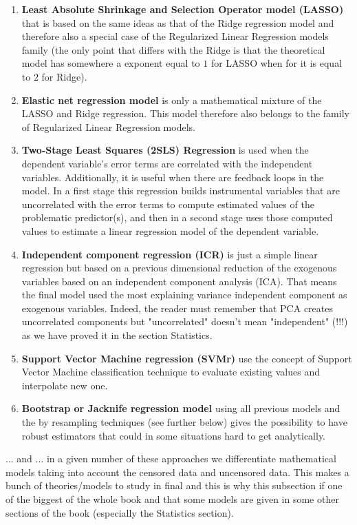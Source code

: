 \begin{enumerate}
		\item \textbf{Least Absolute Shrinkage and Selection Operator model (LASSO)} that is based on the same ideas as that of the Ridge regression model and therefore also a special case of the Regularized Linear Regression models family (the only point that differs with the Ridge is that the theoretical model has somewhere a exponent equal to $1$ for LASSO when for it is equal to $2$ for Ridge).
		
		\item \textbf{Elastic net regression model} is only a mathematical mixture of the LASSO and Ridge regression. This model therefore also belongs to the family of Regularized Linear Regression models.
		
		\item \textbf{Two-Stage Least Squares (2SLS) Regression } is used when the dependent variable’s error terms are correlated with the independent variables. Additionally, it is useful when there are feedback loops in the model. In a first stage this regression builds instrumental variables that are uncorrelated with the error terms to compute estimated values of the problematic predictor(s), and then in a second stage uses those computed values to estimate a linear regression model of the dependent variable.
		
		\item \textbf{Independent component regression (ICR)} is just a simple linear regression but based on a previous dimensional reduction of the exogenous variables based on an independent component analysis (ICA). That means the final model used the most explaining variance independent component as exogenous variables. Indeed, the reader must remember that PCA creates uncorrelated components but "uncorrelated" doesn't mean "independent" (!!!) as we have proved it in the section Statistics.
		
		\item \textbf{Support Vector Machine regression (SVMr)} use the concept of Support Vector Machine classification technique to evaluate existing values and interpolate new one.
		
		\item \textbf{Bootstrap or Jacknife regression model} using all previous models and the by resampling techniques (see further below) gives the possibility to have robust estimators that could in some situations hard to get analytically. 
	\end{enumerate}
	... and ... in a given number of these approaches we differentiate mathematical models taking into account the censored data and uncensored data. This makes a bunch of theories/models to study in final and this is why this subsection if one of the biggest of the whole book and that some models are given in some other sections of the book (especially the Statistics section).
	
